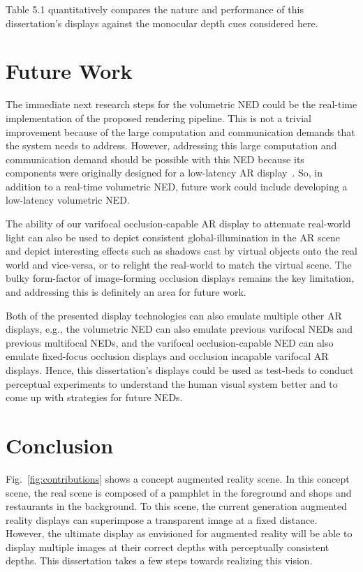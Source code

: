 Table 5.1 quantitatively compares the nature and performance of this dissertation’s displays against the monocular depth cues considered here. 

\section{Future Work}
The immediate next research steps for the volumetric NED could be the real-time implementation of the proposed rendering pipeline. 
This is not a trivial improvement because of the large computation and communication demands that the system needs to address. 
However, addressing this large computation and communication demand should be possible with this NED because its components were originally designed for a low-latency AR display~\cite{Lincoln2016motion}. 
So, in addition to a real-time volumetric NED, future work could include developing a low-latency volumetric NED. 

The ability of our varifocal occlusion-capable AR display to attenuate real-world light can also be used to depict consistent global-illumination in the AR scene and depict interesting effects such as shadows cast by virtual objects onto the real world and vice-versa, or to relight the real-world to match the virtual scene.
The bulky form-factor of image-forming occlusion displays remains the key limitation, and addressing this is definitely an area for future work. 

Both of the presented display technologies can also emulate multiple other AR displays, e.g., the volumetric NED can also emulate previous varifocal NEDs and previous multifocal NEDs, and the varifocal occlusion-capable NED can also emulate fixed-focus occlusion displays and occlusion incapable varifocal AR displays. 
Hence, this dissertation’s displays could be used as test-beds to conduct perceptual experiments to understand the human visual system better and to come up with strategies for future NEDs.

\section{Conclusion}

Fig.~\ref{fig:contributions} shows a concept augmented reality scene. In this concept scene, the real scene is composed of a pamphlet in the foreground and shops and restaurants in the background. To this scene, the current generation augmented reality displays can superimpose a transparent image at a fixed distance. However, the ultimate display as envisioned for augmented reality will be able to display multiple images at their correct depths with perceptually consistent depths. This dissertation takes a few steps towards realizing this vision.

